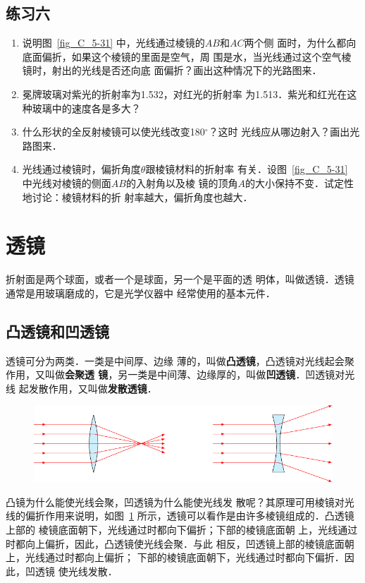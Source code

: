 \subsection*{练习六}
\begin{enumerate}
    \item 说明图~\ref{fig_C_5-31} 中，光线通过棱镜的$AB$和$AC$两个侧
面时，为什么都向底面偏折，如果这个棱镜的里面是空气，周
围是水，当光线通过这个空气棱镜时，射出的光线是否还向底
面偏折？画出这种情况下的光路图来．
\item 冕牌玻璃对紫光的折射率为1.532，对红光的折射率
为1.513．紫光和红光在这种玻璃中的速度各是多大？
\item 什么形状的全反射棱镜可以使光线改变180$^\circ$？这时
光线应从哪边射入？画出光路图来．
\item 光线通过棱镜时，偏折角度$\theta$跟棱镜材料的折射率
有关．设图~\ref{fig_C_5-31} 中光线对棱镜的侧面$AB$的入射角以及棱
镜的顶角$A$的大小保持不变．试定性地讨论：棱镜材料的折
射率越大，偏折角度也越大．
\end{enumerate}

\section{透镜}
折射面是两个球面，或者一个是球面，另一个是平面的透
明体，叫做透镜．透镜通常是用玻璃磨成的，它是光学仪器中
经常使用的基本元件．

\subsection{凸透镜和凹透镜}

透镜可分为两类．一类是中间厚、边缘
薄的，叫做\textbf{凸透镜}，凸透镜对光线起会聚作用，又叫做\textbf{会聚透
镜}，另一类是中间薄、边缘厚的，叫做\textbf{凹透镜}．凹透镜对光线
起发散作用，又叫做\textbf{发散透镜}．
\begin{figure}[htbp]
    \centering
    \includegraphics{fig/C/5-34.pdf}
    \caption{}\label{fig_C_5-34}
\end{figure}


凸镜为什么能使光线会聚，凹透镜为什么能使光线发
散呢？其原理可用棱镜对光线的偏折作用来说明，如图~\ref{fig_C_5-34} 所示，透镜可以看作是由许多棱镜组成的．凸透镜上部的
棱镜底面朝下，光线通过时都向下偏折；下部的棱镜底面朝
上，光线通过时都向上偏折，因此，凸透镜使光线会聚．与此
相反，凹透镜上部的棱镜底面朝上，光线通过时都向上偏折；
下部的棱镜底面朝下，光线通过时都向下偏折．因此，凹透镜
使光线发散．

